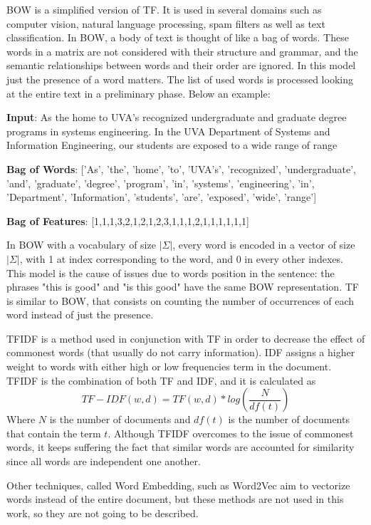 \begin{description}
	\item \ac{BOW} is a simplified version of \ac{TF}. It is used in several domains such as computer vision, natural language processing, spam filters as well as text classification. In \ac{BOW}, a body of text is thought of like a bag of words. These words in a matrix are not considered with their structure and grammar, and the semantic relationships between words and their order are ignored. In this model just the presence of a word matters. The list of used words is processed looking at the entire text in a preliminary phase. Below an example:
	\begin{description}
		\item \textbf{Input}: As the home to UVA’s recognized undergraduate and graduate degree programs in systems
		engineering. In the UVA Department of Systems and Information Engineering, our students are
		exposed to a wide range of range
		\item \textbf{Bag of Words}: ['As', 'the', 'home', 'to', 'UVA’s', 'recognized', 'undergraduate', 'and', 'graduate', 'degree', 'program', 'in', 'systems', 'engineering', 'in', 'Department', 'Information', 'students', 'are', 'exposed', 'wide', 'range']
		\item \textbf{Bag of Features}: [1,1,1,3,2,1,2,1,2,3,1,1,1,2,1,1,1,1,1,1]
	\end{description}
	In \ac{BOW} with a vocabulary of size $|\Sigma|$, every word is encoded in a vector of size $|\Sigma|$, with 1 at index corresponding to the word, and 0 in every other indexes. This model is the cause of issues due to words position in the sentence: the phrases "this is good" and "is this good" have the same \ac{BOW} representation. \ac{TF} is similar to \ac{BOW}, that consists on counting the number of occurrences of each word instead of just the presence.
	\item \ac{TFIDF} is a method used in conjunction with \ac{TF} in order to decrease the effect of commonest words (that usually do not carry information). \ac{IDF} assigns a higher weight to words with either high or low frequencies term in the document. \ac{TFIDF} is the combination of both \ac{TF} and \ac{IDF}, and it is calculated as
	\[TF-IDF(w,d) = TF(w, d) * log(\frac{N}{df(t)})\]
	Where $N$ is the number of documents and $df(t)$ is the number of documents that contain the term $t$. Although \ac{TFIDF} overcomes to the issue of commonest words, it keeps suffering the fact that similar words are accounted for similarity since all words are independent one another. 
	\item Other techniques, called Word Embedding, such as Word2Vec \cite{NIPS2013_5021} aim to vectorize words instead of the entire document, but these methods are not used in this work, so they are not going to be described.
\end{description}


